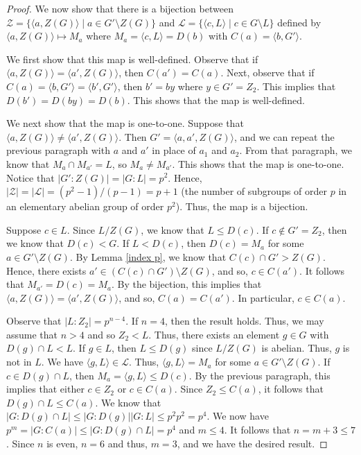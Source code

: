 \begin{proof}
We now show that there is a bijection between ${\mathcal Z} = \{ \langle a, Z (G) \rangle \mid a \in G' \setminus Z (G) \}$ and ${\mathcal L} = \{ \langle c, L \rangle \mid c \in G \setminus L \}$ defined by $\langle a, Z(G) \rangle \mapsto M_a$ where $M_a = \langle c, L \rangle = D (b)$ with $C (a) = \langle b, G' \rangle$.

We first show that this map is well-defined.  Observe that if $\langle a, Z(G) \rangle = \langle a', Z(G) \rangle$, then $C (a') = C (a)$.  Next, observe that if $C (a) = \langle b, G' \rangle = \langle b', G' \rangle$, then $b' = b y$ where $y \in G' = Z_2$.  This implies that $D (b') = D (by) = D (b)$.  This shows that the map is well-defined.

We next show that the map is one-to-one.  Suppose that $\langle a, Z (G) \rangle \ne \langle a', Z(G) \rangle$.  Then $G' = \langle a, a', Z(G) \rangle$, and we can repeat the previous paragraph with $a$ and $a'$ in place of $a_1$ and $a_2$.  From that paragraph, we know that $M_a \cap M_{a'} = L$, so $M_a \ne M_{a'}$.  This shows that the map is one-to-one.  Notice that $|G':Z(G)| = |G:L| = p^2$.  Hence, $|{\mathcal Z}| = |{\mathcal L}| = (p^2 - 1)/(p - 1) = p+1$ (the number of subgroups of order $p$ in an elementary abelian group of order $p^2$).  Thus, the map is a bijection.

Suppose $c \in L$.  Since $L/Z(G)$, we know that $L \le D (c)$. If $c \not\in G' = Z_2$, then we know that $D (c) < G$.  If $L < D (c)$, then $D (c) = M_a$ for some $a \in G' \setminus Z (G)$.  By Lemma \ref{index p}, we know that $C (c) \cap G' > Z (G)$.  Hence, there exists $a' \in (C (c) \cap G') \setminus Z (G)$, and so, $c \in C (a')$.  It follows that $M_{a'} = D (c) = M_a$.  By the bijection, this implies that $\langle a, Z(G) \rangle = \langle a', Z(G) \rangle$, and so, $C (a) = C (a')$. In particular, $c \in C (a)$.

Observe that $|L:Z_2| = p^{n-4}$.  If $n = 4$, then the result holds.  Thus, we may assume that $n > 4$ and so $Z_2 < L$.  Thus, there exists an element $g \in G$ with $D (g) \cap L < L$.  If $g \in L$, then $L \le D (g)$ since $L/Z(G)$ is abelian.  Thus, $g$ is not in $L$.  We have $\langle g, L \rangle \in {\mathcal L}$.  Thus, $\langle g, L \rangle = M_a$ for some $a \in G' \setminus Z (G)$.  If $c \in D (g) \cap L$, then $M_a = \langle g, L \rangle \le D (c)$.  By the previous paragraph, this implies that either $c \in Z_2$ or $c \in C (a)$.  Since $Z_2 \le C (a)$, it follows that $D (g) \cap L \le C (a)$.  We know that $|G: D(g) \cap L| \le |G:D (g)||G:L| \le p^2 p^2 = p^4$.  We now have $p^{m} = |G:C (a)| \le |G:D (g) \cap L| = p^4$ and $m \le 4$.  It follows that $n = m + 3 \le 7$.  Since $n$ is even, $n = 6$ and thus, $m = 3$, and we have the desired result.
\end{proof}


